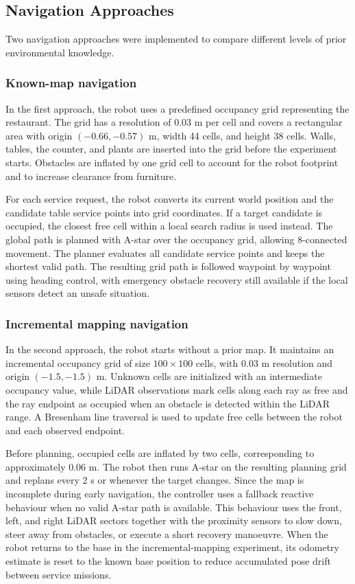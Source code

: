 \documentclass[conference]{IEEEtran}
\begin{document}
\subsection{Navigation Approaches}

Two navigation approaches were implemented to compare different levels of
prior environmental knowledge.

\subsubsection{Known-map navigation}

In the first approach, the robot uses a predefined occupancy grid representing
the restaurant. The grid has a resolution of 0.03 m per cell and covers a
rectangular area with origin $(-0.66,-0.57)$ m, width 44 cells, and height 38
cells. Walls, tables, the counter, and plants are inserted into the grid before
the experiment starts. Obstacles are inflated by one grid cell to account for
the robot footprint and to increase clearance from furniture.

For each service request, the robot converts its current world position and the
candidate table service points into grid coordinates. If a target candidate is
occupied, the closest free cell within a local search radius is used instead.
The global path is planned with A-star over the occupancy grid, allowing
8-connected movement. The planner evaluates all candidate service points and
keeps the shortest valid path. The resulting grid path is followed waypoint by
waypoint using heading control, with emergency obstacle recovery still
available if the local sensors detect an unsafe situation.

\subsubsection{Incremental mapping navigation}

In the second approach, the robot starts without a prior map. It maintains an
incremental occupancy grid of size $100 \times 100$ cells, with 0.03 m
resolution and origin $(-1.5,-1.5)$ m. Unknown cells are initialized with an
intermediate occupancy value, while LiDAR observations mark cells along each
ray as free and the ray endpoint as occupied when an obstacle is detected
within the LiDAR range. A Bresenham line traversal is used to update free cells
between the robot and each observed endpoint.

Before planning, occupied cells are inflated by two cells, corresponding to
approximately 0.06 m. The robot then runs A-star on the resulting planning grid
and replans every 2 s or whenever the target changes. Since the map is
incomplete during early navigation, the controller uses a fallback reactive
behaviour when no valid A-star path is available. This behaviour uses the
front, left, and right LiDAR sectors together with the proximity sensors to
slow down, steer away from obstacles, or execute a short recovery manoeuvre.
When the robot returns to the base in the incremental-mapping experiment, its
odometry estimate is reset to the known base position to reduce accumulated
pose drift between service missions.
\end{document}
